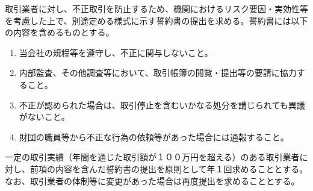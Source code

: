 \documentclass[10pt,a4paper]{jsarticle}
\begin{document}
取引業者に対し、不正取引を防止するため、機関におけるリスク要因・実効性等を考慮した上で、別途定める様式に示す誓約書の提出を求める。誓約書には以下の内容を含めるものとする。
\begin{enumerate}
	\item 当会社の規程等を遵守し、不正に関与しないこと。
	\item 内部監査、その他調査等において、取引帳簿の閲覧・提出等の要請に協力すること。
	\item 不正が認められた場合は、取引停止を含むいかなる処分を講じられても異議がないこと。
	\item 財団の職員等から不正な行為の依頼等があった場合には通報すること。
\end{enumerate}
\term 一定の取引実績（年間を通じた取引額が１００万円を超える）のある取引業者に対し、前項の内容を含んだ誓約書の提出を原則として年１回求めることとする。なお、取引業者の体制等に変更があった場合は再度提出を求めることとする。
\end{document}
